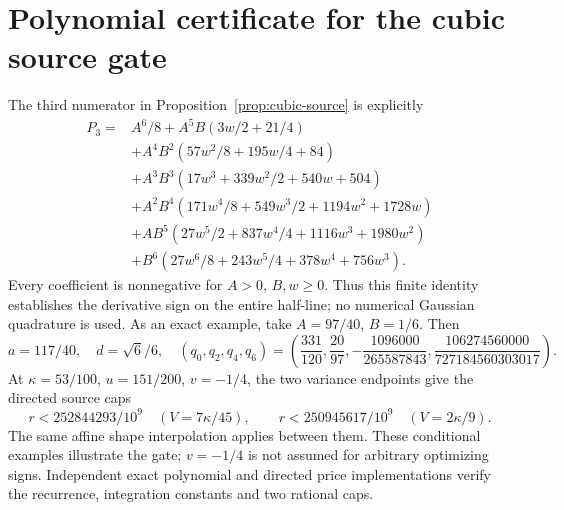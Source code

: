 \documentclass[11pt]{article}
\begin{document}
\section{Polynomial certificate for the cubic source gate}\label{app:cubic-source}
The third numerator in Proposition~\ref{prop:cubic-source} is explicitly
\begin{align*}
 P_3={}&A^6/8+A^5B(3w/2+21/4)\\
 &+A^4B^2(57w^2/8+195w/4+84)\\
 &+A^3B^3(17w^3+339w^2/2+540w+504)\\
 &+A^2B^4(171w^4/8+549w^3/2+1194w^2+1728w)\\
 &+AB^5(27w^5/2+837w^4/4+1116w^3+1980w^2)\\
 &+B^6(27w^6/8+243w^5/4+378w^4+756w^3).
\end{align*}
Every coefficient is nonnegative for $A>0$, $B,w\ge0$.
Thus this finite identity establishes the derivative sign on the entire
half-line; no numerical Gaussian quadrature is used.
As an exact example, take $A=97/40$, $B=1/6$. Then
\[
 a=117/40,\quad d=\sqrt6/6,\quad
 (q_0,q_2,q_4,q_6)=
 \left(\frac{331}{120},\frac{20}{97},
 -\frac{1096000}{265587843},
 \frac{106274560000}{727184560303017}\right).
\]
At $\kappa=53/100$, $u=151/200$, $v=-1/4$, the two variance
endpoints give the directed source caps
\[
 r<252844293/10^9 \quad(V=7\kappa/45),\qquad
 r<250945617/10^9 \quad(V=2\kappa/9).
\]
The same affine shape interpolation applies between them.
These conditional examples illustrate the gate; $v=-1/4$ is not assumed
for arbitrary optimizing signs. Independent exact polynomial and directed
price implementations verify the recurrence, integration constants and
two rational caps.
\end{document}
